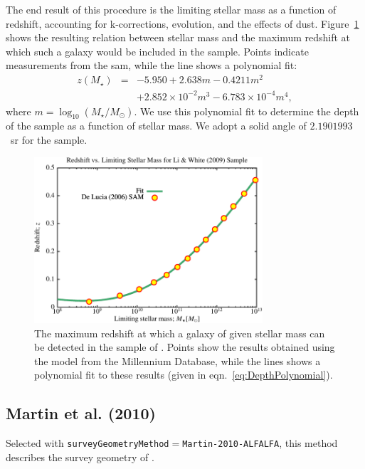 The end result of this procedure is the limiting stellar mass as a function of redshift, accounting for k-corrections, evolution, and the effects of dust. Figure~\ref{fig:SDSSDepthFit} shows the resulting relation between stellar mass and the maximum redshift at which such a galaxy would be included in the sample. Points indicate measurements from the \gls{sam}, while the line shows a polynomial fit:
\begin{eqnarray}
 z(M_\star) &=& -5.950 + 2.638 m - 0.4211 m^2 \nonumber \\ 
            & & + 2.852\times 10^{-2} m^3 - 6.783 \times 10^{-4} m^4,
 \label{eq:DepthPolynomial}
\end{eqnarray}
where $m= \log_{10}(M_\star/M_\odot)$. We use this polynomial fit to determine the depth of the sample as a function of stellar mass. We adopt a solid angle of $2.1901993$~sr \citep{percival_shape_2007} for the sample.

\begin{figure}
 \includegraphics[width=85mm,trim=0mm 0mm 0mm 4mm,clip]{Plots/DataAnalysis/SDSSMassLuminosityRelation.pdf}
 \caption{The maximum redshift at which a galaxy of given stellar mass can be detected in the sample of \protect\cite{li_distribution_2009}. Points show the results obtained using the \protect\cite{de_lucia_hierarchical_2007} model from the Millennium Database, while the lines shows a polynomial fit to these results (given in eqn.~\ref{eq:DepthPolynomial}).}
 \label{fig:SDSSDepthFit}
\end{figure}

\subsection{Martin et al. (2010)}

Selected with {\tt surveyGeometryMethod}$=${\tt Martin-2010-ALFALFA}, this method describes the survey geometry of \cite{martin_arecibo_2010}. 

